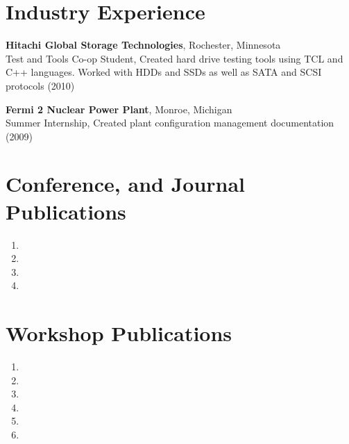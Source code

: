 \documentclass{article}
\begin{document}
\section*{Industry Experience}
\vspace{-6pt}

{\bf Hitachi Global Storage Technologies}, Rochester, Minnesota \\
Test and Tools Co-op Student, Created hard drive testing tools using TCL and
C++ languages. Worked with HDDs and SSDs as well as SATA and SCSI protocols (2010)

{\bf Fermi 2 Nuclear Power Plant}, Monroe, Michigan \\
Summer Internship, Created plant configuration management documentation (2009)


\section*{Conference, and Journal Publications}
\begin{enumerate}
  \item {}
  \item {}
  \item {}
  \item {}
\end{enumerate}

\section*{Workshop Publications}
\begin{enumerate}
  \item {}
  \item {}
  \item {}
  \item {}
  \item {}
  \item {}
\end{enumerate}
\end{document}
